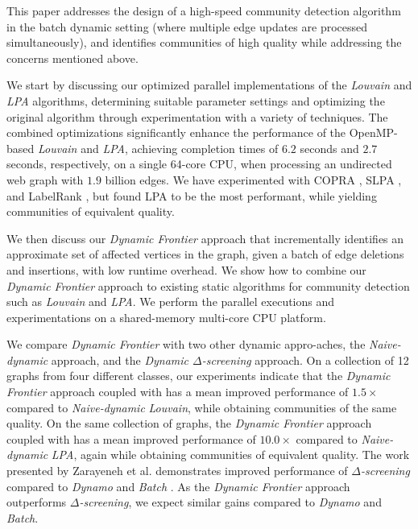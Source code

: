 This paper addresses the design of a high-speed community detection algorithm in the batch dynamic setting (where multiple edge updates are processed simultaneously), and identifies communities of high quality while addressing the concerns mentioned above.

We start by discussing our optimized parallel implementations of the \textit{Louvain} and \textit{LPA} algorithms, determining suitable parameter settings and optimizing the original algorithm through experimentation with a variety of techniques. The combined optimizations significantly enhance the performance of the OpenMP-based \textit{Louvain} and \textit{LPA}, achieving completion times of $6.2$ seconds and $2.7$ seconds, respectively, on a single 64-core CPU, when processing an undirected web graph with $1.9$ billion edges. We have experimented with COPRA \cite{com-gregory10}, SLPA \cite{com-xie11}, and LabelRank \cite{com-xie13}, but found LPA \cite{com-raghavan07} to be the most performant, while yielding communities of equivalent quality.

We then discuss our \textit{Dynamic Frontier} approach that incrementally identifies an approximate set of affected vertices in the graph, given a batch of edge deletions and insertions, with low runtime overhead. We show how to combine our \textit{Dynamic Frontier} approach to existing static algorithms for community detection such as \textit{Louvain} and \textit{LPA}. We perform the parallel executions and experimentations on a shared-memory multi-core CPU platform.

We compare \textit{Dynamic Frontier} with two other dynamic appro-aches, the \textit{Naive-dynamic} approach, and the \textit{Dynamic $\Delta$-screening} approach. On a collection of 12 graphs from four different classes, our experiments indicate that the \textit{Dynamic Frontier} approach coupled with \Lou{} has a mean improved performance of $1.5\times$ compared to \textit{Naive-dynamic} \textit{Louvain}, while obtaining communities of the same quality. On the same collection of graphs, the \textit{Dynamic Frontier} approach coupled with \LPA{} has a mean improved performance of $10.0\times$ compared to \textit{Naive-dynamic} \textit{LPA}, again while obtaining communities of equivalent quality. The work presented by Zarayeneh et al. \cite{com-zarayeneh21} demonstrates improved performance of \textit{$\Delta$-screening} compared to \textit{Dynamo} \cite{com-zhuang19} and \textit{Batch} \cite{com-chong13}. As the \textit{Dynamic Frontier} approach outperforms \textit{$\Delta$-screening}, we expect similar gains compared to \textit{Dynamo} and \textit{Batch}.

